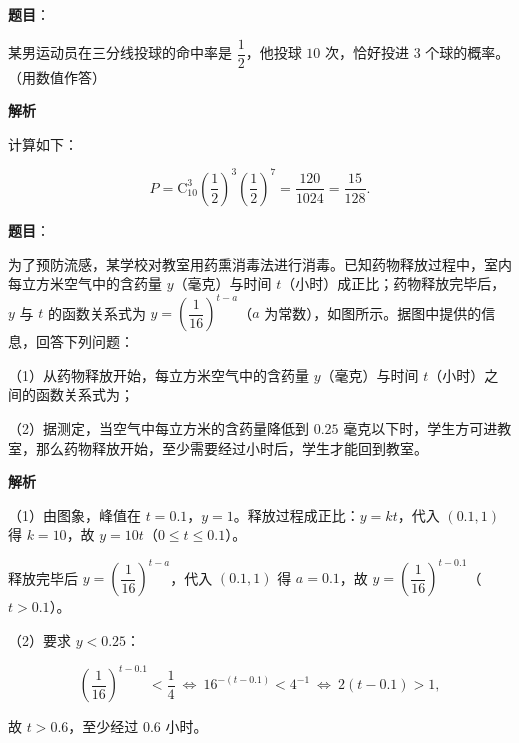 \begin{answer}

\textbf{题目}：

某男运动员在三分线投球的命中率是 $\dfrac12$，他投球 $10$ 次，恰好投进 $3$ 个球的概率\gkblank{}。（用数值作答）

\textbf{解析}

计算如下：

\nopagebreak[4]
\[P=\mathrm C_{10}^3\left(\frac12\right)^3\left(\frac12\right)^7=\frac{120}{1024}=\frac{15}{128}.\]


\end{answer}
\begin{answer}

\textbf{题目}：

为了预防流感，某学校对教室用药熏消毒法进行消毒。已知药物释放过程中，室内每立方米空气中的含药量 $y$（毫克）与时间 $t$（小时）成正比；药物释放完毕后，$y$ 与 $t$ 的函数关系式为 $y=\left(\dfrac1{16}\right)^{t-a}$（$a$ 为常数），如图所示。据图中提供的信息，回答下列问题：

（1）从药物释放开始，每立方米空气中的含药量 $y$（毫克）与时间 $t$（小时）之间的函数关系式为\gkblank{}；

（2）据测定，当空气中每立方米的含药量降低到 $0.25$ 毫克以下时，学生方可进教室，那么药物释放开始，至少需要经过\gkblank{}小时后，学生才能回到教室。
\nopagebreak[4]
\begin{center}\end{center}
\nopagebreak[4]
\textbf{解析}

（1）由图象，峰值在 $t=0.1$，$y=1$。释放过程成正比：$y=kt$，代入 $(0.1,1)$ 得 $k=10$，故 $y=10t$（$0\leqslant t\leqslant0.1$）。

释放完毕后 $y=\left(\dfrac1{16}\right)^{t-a}$，代入 $(0.1,1)$ 得 $a=0.1$，故 $y=\left(\dfrac1{16}\right)^{t-0.1}$（$t>0.1$）。

（2）要求 $y<0.25$：

\nopagebreak[4]
\[\left(\frac1{16}\right)^{t-0.1}<\frac14\ \Longleftrightarrow\ 16^{-(t-0.1)}<4^{-1}\ \Longleftrightarrow\ 2(t-0.1)>1,\]

故 $t>0.6$，至少经过 $0.6$ 小时。


\end{answer}
